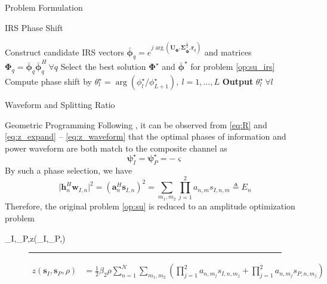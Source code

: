 \documentclass{IEEEtran}
\begin{document}
\begin{section}{Problem Formulation}
\begin{subsection}{IRS Phase Shift}
\begin{algorithm}
\begin{algorithmic}[1]
				\State Construct candidate IRS vectors $\bar{\boldsymbol{\phi}}_q=e^{j\arg\left(\boldsymbol{U}_{\boldsymbol{\Phi}^{\star}}\boldsymbol{\Sigma}_{\boldsymbol{\Phi}^{\star}}^{\frac{1}{2}}\boldsymbol{r}_q\right)}$ and matrices $\boldsymbol{\Phi}_q=\bar{\boldsymbol{\phi}}_q\bar{\boldsymbol{\phi}}_q^H  \ \forall q$
				\State Select the best solution $\boldsymbol{\Phi}^\star$ and $\bar{\boldsymbol{\phi}}^\star$ for problem \ref{op:su_irs}
				\State Compute phase shift by $\theta_l^\star=\arg(\phi_l^\star/\phi_{L+1}^\star), \ l=1,\dots,L$
				\State \textbf{Output} $\theta_l^\star \ \forall l$
			\end{algorithmic}
		\end{algorithm}
	\end{subsection}

	\begin{subsection}{Waveform and Splitting Ratio}
		\begin{subsubsection}{Geometric Programming}
			Following \cite{Clerckx2018b}, it can be observed from \ref{eq:R} and \ref{eq:z_expand} -- \ref{eq:z_waveform} that the optimal phases of information and power waveform are both match to the composite channel as
			\begin{equation}\label{eq:psi}
				\boldsymbol{\psi}_{I}^{\star}=\boldsymbol{\psi}_{P}^{\star}=-\boldsymbol{\varsigma}
			\end{equation}
			By such a phase selection, we have
			\begin{equation}
				\lvert{\boldsymbol{h}_n^H\boldsymbol{w}_{I,n}}\rvert^2=(\boldsymbol{a}_n^H\boldsymbol{s}_{I,n})^2=\sum_{m_1,m_2}\prod_{j=1}^2{a_{n,m}s_{I,n,m}} \triangleq E_n
			\end{equation}
			Therefore, the original problem \ref{op:su} is reduced to an amplitude optimization problem
			\begin{maxi!}
					{\boldsymbol{s}_I,_P,\rho}{z(_I,_P,\rho)}{\label{op:su_gp}}{}
				\end{maxi!}
			\begin{figure}[b]
				\hrule
				\begin{equation}\label{eq:z_gp}
					\begin{split}
						z(\boldsymbol{s}_I,\boldsymbol{s}_P,\rho)
						& = \frac{1}{2}{\beta_2}{\rho} \sum_{n=1}^N \sum_{m_1,m_2} \left( \prod_{j=1}^2 {a_{n,m_j}s_{I,n,m_j}} + \prod_{j=1}^2 {a_{n,m_j}s_{P,n,m_j}} \right)\\

\end{split}
\end{equation}
\end{figure}
\end{subsubsection}
\end{subsection}
\end{section}
\end{document}
